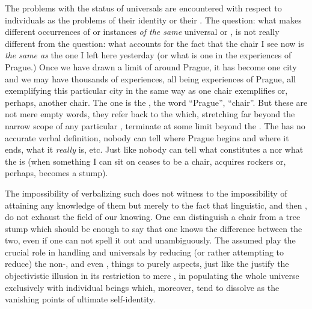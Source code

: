 The problems with the status of universals are encountered with respect to
individuals as the problems of their identity or their . The
question: what makes different occurrences of  or 
instances {\em of the same} universal  or , is not really
different from the question: what accounts for the fact that the chair I see now
is {\em the same as} the one I left here yesterday (or what is one in the
experiences of Prague.)  Once we have drawn a limit of  around
Prague, it has become one city and we may have thousands of experiences, all
being experiences of Prague, all exemplifying this particular city in the same
way as one chair exemplifies  or, perhaps, another chair.  The one is
the , the word ``Prague'', ``chair''.  But these are not mere empty
words, they refer back to the  which, stretching far
beyond the narrow scope of any particular \herenow, terminate at some limit
beyond the \hoa.  The  has no accurate verbal definition, nobody
can tell  where Prague begins and where it ends, what it {\em
  really} is, etc.  Just like nobody can tell  what constitutes a
 nor what the   is (when something I can sit on
ceases to be a chair, acquires rockers or, perhaps, becomes a {stump}).

The impossibility of verbalizing such  does not witness to the
impossibility of attaining any knowledge of them but merely to the fact that
linguistic, and then ,  do not exhaust the field
of our knowing. One can distinguish a chair from a tree stump which should be
enough to say that one knows the difference between the two, even if one can not
spell it out  and unambiguously. The assumed  play
the crucial role in handling  and universals by reducing (or rather
attempting to reduce) the non-, and even , things to
purely  aspects, just like the  justify the
objectivistic illusion in its restriction to mere , in populating
the whole universe exclusively with individual beings which, moreover, tend to
dissolve as the vanishing points of ultimate self-identity.


